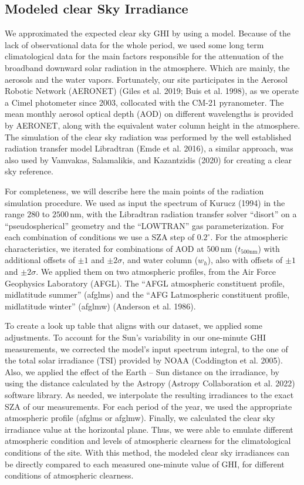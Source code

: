 \documentclass[
]{article}
\begin{document}
\hypertarget{modeled-clear-sky-irradiance}{%
\subsection{Modeled clear Sky Irradiance}\label{modeled-clear-sky-irradiance}}

We approximated the expected clear sky GHI by using a model. Because of the lack of
observational data for the whole period, we used some long term climatological data
for the main factors responsible for the attenuation of the broadband downward solar
radiation in the atmosphere. Which are mainly, the aerosols and the water vapors.
Fortunately, our site participates in the Aerosol Robotic Network (AERONET)
(Giles et al. 2019; Buis et al. 1998), as we operate a Cimel photometer since 2003, collocated with
the CM-21 pyranometer. The mean monthly aerosol optical depth (AOD) on different
wavelengths is provided by AERONET, along with the equivalent water column height in
the atmosphere. The simulation of the clear sky radiation was performed by the well
established radiation transfer model Libradtran (Emde et al. 2016), a similar
approach, was also used by Vamvakas, Salamalikis, and Kazantzidis (2020) for creating a clear sky reference.

For completeness, we will describe here the main points of the radiation simulation
procedure. We used as input the spectrum of Kurucz (1994) in the range \(280\) to
\(2500\,\text{nm}\), with the Libradtran radiation transfer solver ``disort'' on a
``pseudospherical'' geometry and the ``LOWTRAN'' gas parameterization. For each
combination of conditions we use a SZA step of \(0.2^\circ\).
For the atmospheric characteristics, we iterated for combinations of AOD at
\(500\,\text{nm}\) (\(t_{500\text{nm}}\)) with additional offsets of \(\pm1\) and
\(\pm2\sigma\), and water column (\(w_h\)), also with offsets of \(\pm1\) and \(\pm2\sigma\).
We applied them on two atmospheric profiles, from the Air Force Geophysics
Laboratory (AFGL). The ``AFGL atmospheric constituent profile, midlatitude summer''
(afglms) and the ``AFG Latmospheric constituent profile, midlatitude winter'' (afglmw)
(Anderson et al. 1986).

To create a look up table that aligns with our dataset, we applied some adjustments.
To account for the Sun's variability in our one-minute GHI measurements, we corrected
the model's input spectrum integral, to the one of the total solar irradiance (TSI)
provided by NOAA (Coddington et al. 2005). Also, we applied the effect of the Earth -- Sun
distance on the irradiance, by using the distance calculated by the Astropy
(Astropy Collaboration et al. 2022) software library. As needed, we interpolate the resulting
irradiances to the exact SZA of our measurements. For each period of the year, we
used the appropriate atmospheric profile (afglms or afglmw). Finally, we calculated
the clear sky irradiance value at the horizontal plane. Thus, we were able to
emulate different atmospheric condition and levels of atmospheric clearness for the
climatological conditions of the site. With this method, the modeled clear sky
irradiances can be directly compared to each measured one-minute value of GHI, for
different conditions of atmospheric clearness.
\end{document}
